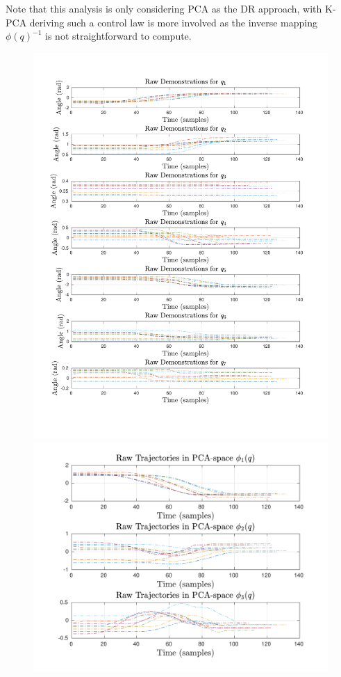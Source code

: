 \documentclass{article}
\begin{document}
Note that this analysis is only considering PCA as the DR approach, with K-PCA deriving such a control law is more involved as the inverse mapping $\phi(q)^{-1}$ is not straightforward to compute.


\begin{figure}[!th] 
  \begin{minipage}{0.58\textwidth}
     	\centering 
     	\includegraphics[trim={1.2cm 2cm 1.7cm 2cm},clip,width=\linewidth]{../../src/JTDS_mat_lib/figures/raw_demos_pour.pdf}
  \end{minipage}
   \begin{minipage}{0.47\textwidth}
      	\centering
      	\includegraphics[trim={1.2cm 0.5cm 0.5cm 0.35cm},clip,width=\linewidth]{../../src/JTDS_mat_lib/figures/raw_demos_pca_pour.pdf}

\end{minipage}
\end{figure}
\end{document}
